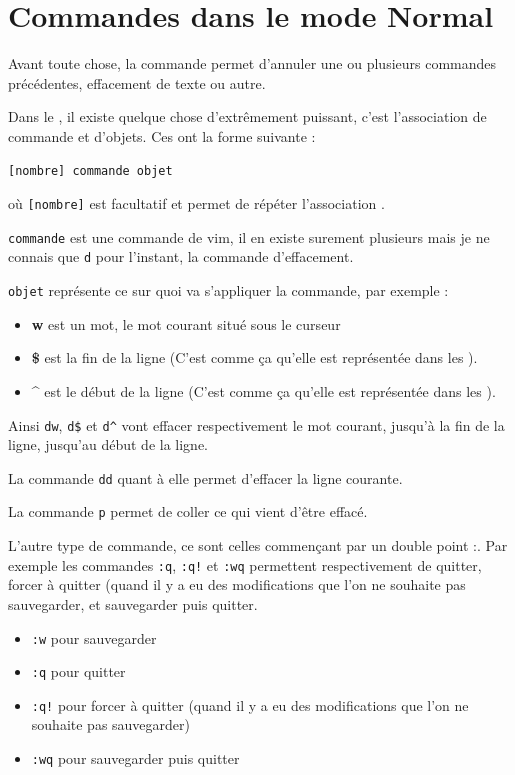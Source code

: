\documentclass[a4paper,twoside]{article}
\begin{document}
\section{Commandes dans le mode Normal}
Avant toute chose, la commande  permet d'annuler une ou plusieurs commandes précédentes, effacement de texte ou autre.

\bigskip

Dans le , il existe quelque chose d'extrêmement puissant, c'est l'association de commande et d'objets. Ces  ont la forme suivante :
\begin{verbatim}
[nombre] commande objet
\end{verbatim}
où \verb|[nombre]| est facultatif et permet de répéter l'association .

\texttt{commande} est une commande de vim, il en existe surement plusieurs mais je ne connais que \texttt{d} pour l'instant, la commande d'effacement.

\texttt{objet} représente ce sur quoi va s'appliquer la commande, par exemple :
\begin{itemize}
\item\textbf{w} est un mot, le mot courant situé sous le curseur
\item\textbf{\$} est la fin de la ligne (C'est comme ça qu'elle est représentée dans les ).
\item\textbf{\^} est le début de la ligne (C'est comme ça qu'elle est représentée dans les ).
\end{itemize}

Ainsi \texttt{dw}, \texttt{d\$} et \texttt{d\^} vont effacer respectivement le mot courant, jusqu'à la fin de la ligne, jusqu'au début de la ligne.

La commande \texttt{dd} quant à elle permet d'effacer la ligne courante.

\begin{remarque}
La commande \texttt{p} permet de coller ce qui vient d'être effacé.
\end{remarque}


\bigskip

L'autre type de commande, ce sont celles commençant par un double point \og :\fg. Par exemple les commandes \texttt{:q}, \texttt{:q!} et \texttt{:wq} permettent respectivement de quitter, forcer à quitter (quand il y a eu des modifications que l'on ne souhaite pas sauvegarder, et sauvegarder puis quitter.
\begin{itemize}
\item \texttt{:w} pour sauvegarder
\item \texttt{:q} pour quitter
\item \texttt{:q!} pour forcer à quitter (quand il y a eu des modifications que l'on ne souhaite pas sauvegarder)
\item \texttt{:wq} pour sauvegarder puis quitter
\end{itemize}
\end{document}
